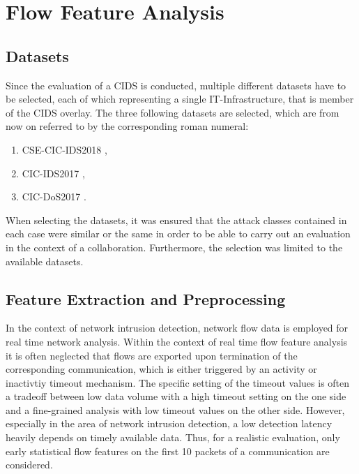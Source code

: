 \documentclass[../../main.tex]{subfiles}
\begin{document}
\section{Flow Feature Analysis}



\subsection{Datasets}


Since the evaluation of a CIDS is conducted, multiple different datasets have to be selected, each of which representing a single IT-Infrastructure, that is member of the CIDS overlay. The three following datasets are selected, which are from now on referred to by the corresponding roman numeral:

\begin{enumerate}
    \item[\RomanNumeralCaps{1}] CSE-CIC-IDS2018 \cite{cse-cic-ids-2018},
    \item[\RomanNumeralCaps{2}] CIC-IDS2017 \cite{sharafaldin_toward_2018},
    \item[\RomanNumeralCaps{3}] CIC-DoS2017 \cite{jazi2017detecting}.
\end{enumerate}

When selecting the datasets, it was ensured that the attack classes contained in each case were similar or the same in order to be able to carry out an evaluation in the context of a collaboration. Furthermore, the selection was limited to the available datasets.

\subsection{Feature Extraction and Preprocessing}

In the context of network intrusion detection, network flow data is employed for real time network analysis. Within the context of real time flow feature analysis it is often neglected that flows are exported upon termination of the corresponding communication, which is either triggered by an activity or inactivtiy timeout mechanism. The specific setting of the timeout values is often a tradeoff between low data volume with a high timeout setting on the one side and a fine-grained analysis with low timeout values on the other side. However, especially in the area of network intrusion detection, a low detection latency heavily depends on timely available data. Thus, for a realistic evaluation, only early statistical flow features on the first 10 packets of a communication are considered. 
\end{document}
